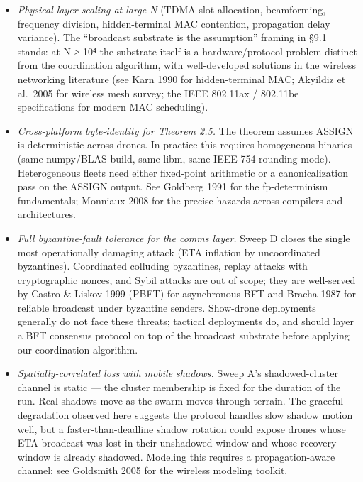 \begin{itemize}
\tightlist
\item
  \emph{Physical-layer scaling at large N} (TDMA slot allocation,
  beamforming, frequency division, hidden-terminal MAC contention,
  propagation delay variance). The ``broadcast substrate is the
  assumption'' framing in §9.1 stands: at N ≥ 10⁴ the substrate itself
  is a hardware/protocol problem distinct from the coordination
  algorithm, with well-developed solutions in the wireless networking
  literature (see Karn 1990 for hidden-terminal MAC; Akyildiz et
  al.~2005 for wireless mesh survey; the IEEE 802.11ax / 802.11be
  specifications for modern MAC scheduling).
\item
  \emph{Cross-platform byte-identity for Theorem 2.5.} The theorem
  assumes ASSIGN is deterministic across drones. In practice this
  requires homogeneous binaries (same numpy/BLAS build, same libm, same
  IEEE-754 rounding mode). Heterogeneous fleets need either fixed-point
  arithmetic or a canonicalization pass on the ASSIGN output. See
  Goldberg 1991 for the fp-determinism fundamentals; Monniaux 2008 for
  the precise hazards across compilers and architectures.
\item
  \emph{Full byzantine-fault tolerance for the comms layer.} Sweep D
  closes the single most operationally damaging attack (ETA inflation by
  uncoordinated byzantines). Coordinated colluding byzantines, replay
  attacks with cryptographic nonces, and Sybil attacks are out of scope;
  they are well-served by Castro \& Liskov 1999 (PBFT) for asynchronous
  BFT and Bracha 1987 for reliable broadcast under byzantine senders.
  Show-drone deployments generally do not face these threats; tactical
  deployments do, and should layer a BFT consensus protocol on top of
  the broadcast substrate before applying our coordination algorithm.
\item
  \emph{Spatially-correlated loss with mobile shadows.} Sweep A's
  shadowed-cluster channel is static --- the cluster membership is fixed
  for the duration of the run. Real shadows move as the swarm moves
  through terrain. The graceful degradation observed here suggests the
  protocol handles slow shadow motion well, but a faster-than-deadline
  shadow rotation could expose drones whose ETA broadcast was lost in
  their unshadowed window and whose recovery window is already shadowed.
  Modeling this requires a propagation-aware channel; see Goldsmith 2005
  for the wireless modeling toolkit.
\end{itemize}


